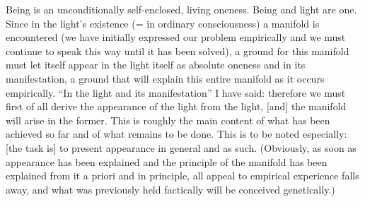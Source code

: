 Being is an unconditionally
self-enclosed, living oneness.
Being and light are one.
Since in the light's existence
(= in ordinary consciousness)
a manifold is encountered
(we have initially expressed our problem empirically
and we must continue to speak this way until it has been solved),
a ground for this manifold must let itself appear
in the light itself as absolute oneness
and in its manifestation,
a ground that will explain this entire manifold
as it occurs empirically.
“In the light and its manifestation”
I have said:
therefore we must first of all derive
the appearance of the light from the light,
[and] the manifold will arise in the former.
This is roughly the main content of
what has been achieved so far
and of what remains to be done.
This is to be noted especially:
[the task is] to present appearance in general and as such.
(Obviously, as soon as appearance has been explained
and the principle of the manifold has been explained
from it a priori and in principle,
all appeal to empirical experience falls away,
and what was previously held factically
will be conceived genetically.)

